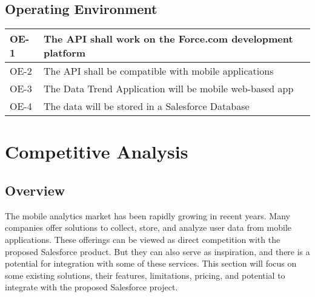 \documentclass[12pt,oneside,letterpaper]{article}
\begin{document}
\subsection{Operating Environment}
\begin{tabular} {| p{1in} | p{4.5in} |}
\hline
OE-1 &  The API shall work on the Force.com development platform\\
\hline
OE-2 &  The API shall be compatible with mobile applications \\
\hline
OE-3 &  The Data Trend Application will be mobile web-based app \\
\hline
OE-4 &  The data will be stored in a Salesforce Database \\
\hline
\end {tabular}

\section{Competitive Analysis}
\subsection{Overview}
The mobile analytics market has been rapidly growing in recent years. Many companies offer solutions to collect, store, and analyze user data from mobile applications. These offerings can be viewed as direct competition with the proposed Salesforce product. But they can also serve as inspiration, and there is a potential for integration with some of these services. This section will focus on some existing solutions, their features, limitations, pricing, and potential to integrate with the proposed Salesforce project.
\end{document}
